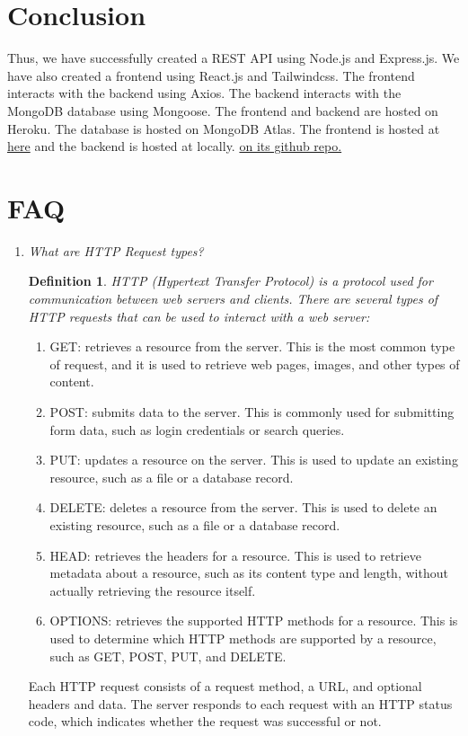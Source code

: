 \documentclass[11pt]{article}
\newtheorem{dfn}[thm]{Definition}
\begin{document}
\section{Conclusion}
Thus, we have successfully created a REST API using Node.js and Express.js. We have also created a frontend using React.js and Tailwindcss. The frontend interacts with the backend using Axios. The backend interacts with the MongoDB database using Mongoose. The frontend and backend are hosted on Heroku. The database is hosted on MongoDB Atlas. The frontend is hosted at \href{http://noveltea.surge.sh/}{here} and the backend is hosted at locally. \href{https://github.com/KrishnarajT/NovelTea-Library}{on its github repo. }

\clearpage

\section{FAQ}
\begin{enumerate}
    \item \textit{What are HTTP Request types?}\\

          \begin{dfn}
              HTTP (Hypertext Transfer Protocol) is a protocol used for communication between web servers and clients. There are several types of HTTP requests that can be used to interact with a web server:
          \end{dfn}

          \begin{enumerate}
              \item GET: retrieves a resource from the server. This is the most common type of request, and it is used to retrieve web pages, images, and other types of content.
              \item POST: submits data to the server. This is commonly used for submitting form data, such as login credentials or search queries.
              \item PUT: updates a resource on the server. This is used to update an existing resource, such as a file or a database record.
              \item DELETE: deletes a resource from the server. This is used to delete an existing resource, such as a file or a database record.
              \item HEAD: retrieves the headers for a resource. This is used to retrieve metadata about a resource, such as its content type and length, without actually retrieving the resource itself.
              \item OPTIONS: retrieves the supported HTTP methods for a resource. This is used to determine which HTTP methods are supported by a resource, such as GET, POST, PUT, and DELETE.
          \end{enumerate}
          Each HTTP request consists of a request method, a URL, and optional headers and data. The server responds to each request with an HTTP status code, which indicates whether the request was successful or not.


\end{enumerate}
\end{document}
